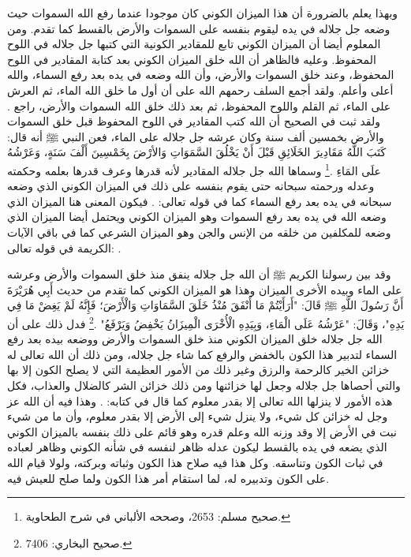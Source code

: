 وبهذا يعلم بالضرورة أن هذا الميزان الكوني كان موجودا عندما رفع الله السموات حيث وضعه جل جلاله في يده ليقوم بنفسه على السموات والأرض بالقسط كما تقدم. ومن المعلوم أيضا أن الميزان الكوني تابع للمقادير الكونية التي كتبها جل جلاله في اللوح المحفوظ. وعليه فالظاهر أن الله خلق الميزان الكوني بعد كتابة المقادير في اللوح المحفوظ، وعند خلق السموات والأرض، وأن الله وضعه في يده بعد رفع السماء، والله أعلى وأعلم. ولقد أجمع السلف رحمهم الله على أن أول ما خلق الله الماء، ثم العرش على الماء، ثم القلم واللوح المحفوظ، ثم بعد ذلك خلق الله السموات والأرض، راجع . ولقد ثبت في الصحيح أن الله كتب المقادير في اللوح المحفوظ قبل خلق السموات والأرض بخمسين ألف سنة وكان عرشه جل جلاله على الماء، فعن النبي ﷺ أنه قال:  كَتَبَ اللَّهُ مَقَادِيرَ الخَلَائِقِ قَبْلَ أَنْ يَخْلُقَ السَّمَوَاتِ وَالأرْضَ بِخَمْسِينَ أَلْفَ سَنَةٍ، وَعَرْشُهُ علَى المَاءِ \href{https://shamela.ws/book/1727/6683#p2}{\faExternalLink} \cite{muslim}.\footnote{صحيح مسلم: 2653، وصححه الألباني في شرح الطحاوية.} وسماها الله جل جلاله المقادير لأنه قدرها وعرف قدرها بعلمه وحكمته وعدله ورحمته سبحانه حتى يقوم بنفسه على ذلك في الميزان الكوني الذي وضعه سبحانه في يده بعد رفع السماء كما في قوله تعالى: 
\quranayah*[55][7]{\footnotesize \surahname*[55]}. فيكون المعنى هنا الميزان الذي وضعه الله في يده بعد رفع السموات وهو الميزان الكوني ويحتمل أيضا الميزان الذي وضعه للمكلفين من خلقه من الإنس والجن وهو الميزان الشرعي كما في باقي الآيات الكريمة في قوله تعالى: 
\quranayah*[55][8-9]{\footnotesize \surahname*[55]}. 

وقد بين رسولنا الكريم ﷺ أن الله جل جلاله ينفق منذ خلق السموات والأرض وعرشه على الماء وبيده الأخرى الميزان وهذا هو الميزان الكوني كما تقدم من حديث أَبِي هُرَيْرَةَ أَنَّ رَسُولَ اللَّهِ ﷺ قَالَ: "أَرَأَيْتُمْ مَا أَنْفَقَ مُنْذُ خَلَقَ السَّمَاوَاتِ وَالْأَرْضَ؛ فَإِنَّهُ لَمْ يَغِضْ مَا فِي يَدِهِ"، وَقَالَ: "عَرْشُهُ عَلَى الْمَاءِ، وَبِيَدِهِ الْأُخْرَى الْمِيزَانُ يَخْفِضُ وَيَرْفَعُ" \href{https://shamela.ws/book/1284/4620#p2}{\faExternalLink} \cite{bukhari}.\footnote{صحيح البخاري: 7406.} فدل ذلك على أن الله جل جلاله خلق الميزان الكوني منذ خلق السموات والأرض ووضعه بيده بعد رفع السماء لتدبير هذا الكون بالخفض والرفع كما شاء جل جلاله، ومن ذلك أن الله تعالى له خزائن الخير كالرحمة والرزق وغير ذلك من الأمور العظيمة التي لا يصلح الكون إلا بها والتي أحصاها جل جلاله وجعل لها خزائنها ومن ذلك خزائن الشر كالضلال والعذاب، فكل هذه الأمور لا ينزلها الله تعالى إلا بقدر معلوم كما قال في كتابه: 
\quranayah*[15][19-21]{\footnotesize \surahname*[15]}. وهذا فيه أن الله عز وجل له خزائن كل شيء، ولا ينزل شيء إلى الأرض إلا بقدر معلوم، وأن ما من شيء نبت في الأرض إلا وقد وزنه الله وعلم قدره وهو قائم على ذلك بنفسه بالميزان الكوني الذي يضعه في يده بالقسط ليكون عدله ظاهر لنفسه في شأنه الكوني وظاهر لعباده في ثبات الكون وتناسقه. وكل هذا فيه صلاح هذا الكون وثباته وبركته، ولولا قيام الله على الكون وتدبيره له، لما استقام أمر هذا الكون ولما صلح للعيش فيه.

